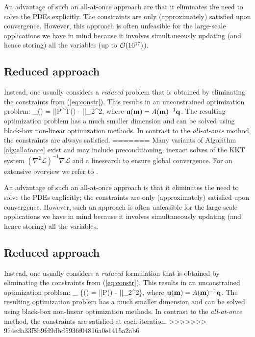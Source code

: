 \documentclass{iopart}
\begin{document}
{An advantage of such an all-at-once approach are that it eliminates the need to
solve the PDEs explicitly. The constraints are only (approximately) satisfied upon convergence. However, this approach is often unfeasible for the large-scale applications we have in mind because it involves simultaneously updating (and hence storing) all the variables (up to $\mathcal{O}(10^{17})$). 

\subsection{Reduced approach}
Instead, one usually considers a \emph{reduced} problem that is obtained by eliminating the constraints from (\ref{eq:constr}). This results in an unconstrained optimization problem:
\bq
\min_{}\phi() = ||P^T() - ||_2^2,
\label{eq:redL}
\eq
where $\mathbf{u}(\mathbf{m}) = A(\mathbf{m})^{-1}\mathbf{q}$. The resulting optimization problem has a much smaller dimension and can be solved using black-box non-linear optimization methods. In contrast to the \emph{all-at-once} method, the constraints are always satisfied.
=======
Many variants of Algorithm \ref{alg:allatonce} exist and may include preconditioning, inexact solves of the KKT system $\left(\nabla^2\mathcal{L}\right)^{-1}\nabla\mathcal{L}$ and a linesearch to ensure global convergence. For an extensive overview we refer to \cite{Herzog2010}.

An advantage of such an all-at-once approach is that it eliminates the need to
solve the PDEs explicitly; the constraints are only (approximately) satisfied upon convergence. However, such an approach is often unfeasible for the large-scale applications we have in mind because it involves simultaneously updating (and hence storing) all the variables.

\subsection{Reduced approach}
Instead, one usually considers a \emph{reduced} formulation that is obtained by eliminating the constraints from (\ref{eq:constr}). This results in an unconstrained optimization problem:
\bq
\min_{} \left\{\phi() = ||P() - ||_2^2\right\},
\label{eq:redL}
\eq
where $\mathbf{u}(\mathbf{m}) = A(\mathbf{m})^{-1}\mathbf{q}$. The resulting optimization problem has a much smaller dimension and can be solved using black-box non-linear optimization methods. In contrast to the \emph{all-at-once} method, the constraints are satisfied at each iteration.
>>>>>>> 974eda33f8b9fd9dbd5936f04816a0e1415a2ab6

}
\end{document}
